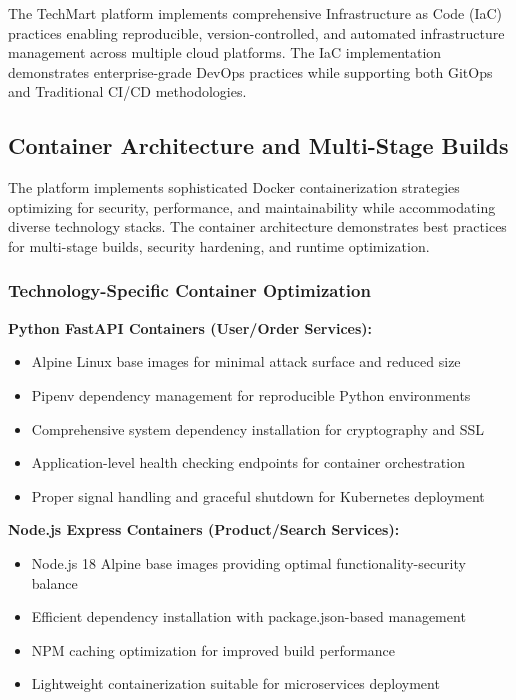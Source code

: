 The TechMart platform implements comprehensive Infrastructure as Code (IaC) practices enabling reproducible, version-controlled, and automated infrastructure management across multiple cloud platforms. The IaC implementation demonstrates enterprise-grade DevOps practices while supporting both GitOps and Traditional CI/CD methodologies.

\subsection{Container Architecture and Multi-Stage Builds}

The platform implements sophisticated Docker containerization strategies optimizing for security, performance, and maintainability while accommodating diverse technology stacks. The container architecture demonstrates best practices for multi-stage builds, security hardening, and runtime optimization.

\subsubsection{Technology-Specific Container Optimization}

\textbf{Python FastAPI Containers (User/Order Services):}
\begin{itemize}
\item Alpine Linux base images for minimal attack surface and reduced size
\item Pipenv dependency management for reproducible Python environments
\item Comprehensive system dependency installation for cryptography and SSL
\item Application-level health checking endpoints for container orchestration
\item Proper signal handling and graceful shutdown for Kubernetes deployment
\end{itemize}

\textbf{Node.js Express Containers (Product/Search Services):}
\begin{itemize}
\item Node.js 18 Alpine base images providing optimal functionality-security balance
\item Efficient dependency installation with package.json-based management
\item NPM caching optimization for improved build performance
\item Lightweight containerization suitable for microservices deployment
\end{itemize}


